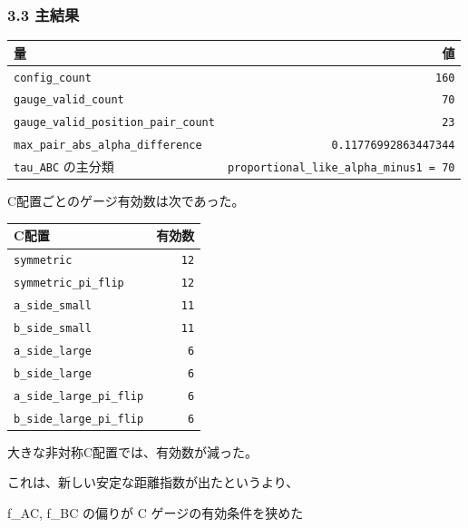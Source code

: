 \documentclass[
]{article}
\newenvironment{Shaded}{}{}
\newcommand{\NormalTok}[1]{#1}
\newcounter{none} %
\begin{document}
\subsubsection{3.3 主結果}\label{ux4e3bux7d50ux679c-1}

{\def\LTcaptype{none} %
\begin{longtable}[]{@{}lr@{}}
\toprule\noalign{}
量 & 値 \\
\midrule\noalign{}
\endhead
\bottomrule\noalign{}
\endlastfoot
\texttt{config\_count} & \texttt{160} \\
\texttt{gauge\_valid\_count} & \texttt{70} \\
\texttt{gauge\_valid\_position\_pair\_count} & \texttt{23} \\
\texttt{max\_pair\_abs\_alpha\_difference} &
\texttt{0.11776992863447344} \\
\texttt{tau\_ABC} の主分類 &
\texttt{proportional\_like\_alpha\_minus1\ =\ 70} \\
\end{longtable}
}

C配置ごとのゲージ有効数は次であった。

{\def\LTcaptype{none} %
\begin{longtable}[]{@{}lr@{}}
\toprule\noalign{}
C配置 & 有効数 \\
\midrule\noalign{}
\endhead
\bottomrule\noalign{}
\endlastfoot
\texttt{symmetric} & \texttt{12} \\
\texttt{symmetric\_pi\_flip} & \texttt{12} \\
\texttt{a\_side\_small} & \texttt{11} \\
\texttt{b\_side\_small} & \texttt{11} \\
\texttt{a\_side\_large} & \texttt{6} \\
\texttt{b\_side\_large} & \texttt{6} \\
\texttt{a\_side\_large\_pi\_flip} & \texttt{6} \\
\texttt{b\_side\_large\_pi\_flip} & \texttt{6} \\
\end{longtable}
}

大きな非対称C配置では、有効数が減った。

これは、新しい安定な距離指数が出たというより、

\begin{Shaded}
\begin{Highlighting}[]
\NormalTok{f\_AC, f\_BC の偏りが C ゲージの有効条件を狭めた}
\end{Highlighting}
\end{Shaded}
\end{document}
